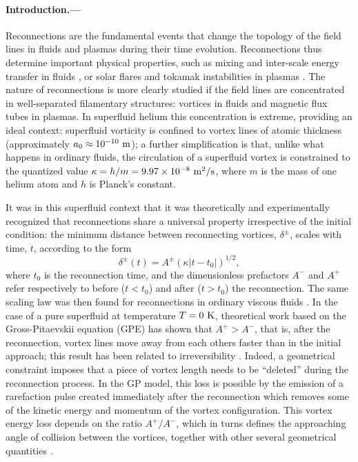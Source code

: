 \documentclass[%
 reprint,
unsortedaddress,
 amsmath,amssymb,
 aps,
 prl,
]{revtex4-2}
\begin{document}
\paragraph*{Introduction.---} Reconnections are the fundamental events that
change the topology of the field lines in fluids and plasmas during their
time evolution. Reconnections
thus determine important physical properties, 
such as mixing and inter-scale energy transfer in fluids \cite{YaoHussainAnnRev2022}, 
or solar flares and tokamak instabilities
in plasmas \cite{Chapman2010}. The nature of reconnections is more clearly
studied if the field lines are concentrated in well-separated
filamentary structures:
vortices in fluids and magnetic flux tubes in plasmas. In superfluid 
helium this concentration is extreme, providing an ideal context:
superfluid vorticity is confined to vortex lines of atomic thickness 
(approximately $a_0 \approx 10^{-10}~\rm m$); a further simplification 
is that, unlike what happens in ordinary fluids, the
circulation of a superfluid vortex  is constrained to the quantized value
$\kappa=h/m=9.97 \times 10^{-8}~\rm m^2/s$, 
where $m$ is the mass of one helium atom and $h$ is Planck's constant. 

It was in this superfluid context that it was theoretically and experimentally recognized
\cite{nazarenko2003,bewley2008,paoletti2010,zuccherQuantumVortexReconnections2012a,villoisUniversalNonuniversalAspects2017a,galantucciCrossoverInteractionDriven2019a,tylutki2021universal}
that reconnections share a universal property irrespective of the initial
condition: the minimum distance between reconnecting 
vortices, $\delta^{\pm}$, scales with time, $t$, according to the form
\begin{equation}
\label{eq:scaling}
	\delta^{\pm}(t) = A^{\pm} (\kappa|t-t_0|)^{1/2},
\end{equation} 
\noindent
where $t_0$ is the reconnection time, and the dimensionless
prefactors $A^-$ and $A^+$ refer respectively to before
($t<t_0$) and after ($t>t_0$) the reconnection. The same scaling law
was then found for reconnections in ordinary viscous fluids 
\cite{yaoSeparationScalingViscous2020}. In the case of a pure
superfluid at temperature $T=0~\rm K$, theoretical work based on
the Gross-Pitaevskii equation (GPE) has shown that
$A^+>A^-$, that is, after the reconnection, vortex lines move away from 
each others faster than in the initial approach; this result has been
related to irreversibility \cite{villoisIrreversibleDynamicsVortex2020,promentMatchingTheoryCharacterize2020}. Indeed, a geometrical constraint imposes 
\cite{promentMatchingTheoryCharacterize2020}
that a piece of vortex length needs to be ``deleted'' 
during the reconnection process. In the GP model, this loss is possible 
by the emission of a rarefaction pulse created immediately after 
the reconnection
\cite{leadbeaterSoundEmissionDue2001b,zuccherQuantumVortexReconnections2012a} which removes some of the kinetic energy and momentum of the vortex configuration.
This vortex energy loss depends on
the ratio $A^+/A^-$, which in turns defines the approaching angle of collision
between the vortices, together with other several geometrical quantities \cite{villoisUniversalNonuniversalAspects2017a,promentMatchingTheoryCharacterize2020}. 
\end{document}
